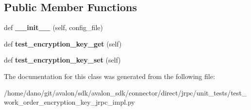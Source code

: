 \subsection*{Public Member Functions}
\begin{DoxyCompactItemize}
\item 
\mbox{\label{classtest__work__order__encryption__key__jrpc__impl_1_1TestWorkOrderEncryptionKeyJRPCImpl_a438c61e7f29832c75881b2bcecf78504}} 
def {\bfseries \+\_\+\+\_\+init\+\_\+\+\_\+} (self, config\+\_\+file)
\item 
\mbox{\label{classtest__work__order__encryption__key__jrpc__impl_1_1TestWorkOrderEncryptionKeyJRPCImpl_ac609e5e8f88690aa5ced685852556d44}} 
def {\bfseries test\+\_\+encryption\+\_\+key\+\_\+get} (self)
\item 
\mbox{\label{classtest__work__order__encryption__key__jrpc__impl_1_1TestWorkOrderEncryptionKeyJRPCImpl_a1edcefa89c809870a2bfbb7e80134a89}} 
def {\bfseries test\+\_\+encryption\+\_\+key\+\_\+set} (self)
\end{DoxyCompactItemize}


The documentation for this class was generated from the following file\+:\begin{DoxyCompactItemize}
\item 
/home/dano/git/avalon/sdk/avalon\+\_\+sdk/connector/direct/jrpc/unit\+\_\+tests/test\+\_\+work\+\_\+order\+\_\+encryption\+\_\+key\+\_\+jrpc\+\_\+impl.\+py\end{DoxyCompactItemize}
